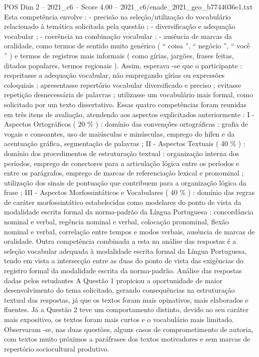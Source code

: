 \begin{textsample}{POS Dim 2 – 2021\_c6 – Score 4.00 – 2021\_c6/enade\_2021\_geo\_b7744036e1.txt}
Esta competência envolve : - precisão na seleção/utilização do vocabulário relacionado à temática solicitada pela questão ; - diversificação e adequação vocabular ; - coerência na combinação vocabular ; - ausência de marcas da oralidade, como termos de sentido muito genérico ( “ coisa ”, “ negócio ”, “ você ” ) e termos de registros mais informais ( como gírias, jargões, frases feitas, ditados populares, termos regionais ).
Assim, esperava -se que o participante : respeitasse a adequação vocabular, não empregando gírias ou expressões coloquiais ; apresentasse repertório vocabular diversificado e preciso ; evitasse repetição desnecessária de palavras ; utilizasse um vocabulário mais formal, como solicitado por um texto dissertativo.
Essas quatro competências foram reunidas em três itens de avaliação, atendendo aos aspectos explicitados anteriormente : I - Aspectos Ortográficos ( 20 \% ) : domínio das convenções ortográficas : grafia de vogais e consoantes, uso de maiúsculas e minúsculas, emprego do hífen e da acentuação gráfica, segmentação de palavras ; II - Aspectos Textuais ( 40 \% ) : domínio dos procedimentos de estruturação textual : organização interna dos períodos, emprego de conectores para a articulação lógica entre os períodos e entre os parágrafos, emprego de marcas de referenciação lexical e pronominal ; utilização dos sinais de pontuação que contribuem para a organização lógica da frase ; III - Aspectos Morfossintáticos e Vocabulares ( 40 \% ) : domínio das regras de caráter morfossintático estabelecidas como modelares do ponto de vista da modalidade escrita formal da norma-padrão da Língua Portuguesa : concordância nominal e verbal, regência nominal e verbal, colocação pronominal, flexão nominal e verbal, correlação entre tempos e modos verbais, ausência de marcas de oralidade.
Outra competência combinada a esta na análise das respostas é a seleção vocabular adequada à modalidade escrita formal da Língua Portuguesa, tendo em vista a intersecção entre as duas do ponto de vista das exigências do registro formal da modalidade escrita da norma-padrão.
Análise das respostas dadas pelos estudantes A Questão 1 propiciou a oportunidade de maior desenvolvimento do tema solicitado, gerando consequências na estruturação textual das respostas, já que os textos foram mais opinativos, mais elaborados e fluentes.
Já a Questão 2 teve um comportamento distinto, devido ao seu caráter mais expositivo, os textos foram mais curtos e o vocabulário mais limitado.
Observaram -se, nas duas questões, alguns casos de comprometimento de autoria, com textos muito próximos a paráfrases dos textos motivadores e sem marcas de repertório sociocultural produtivo.

\end{textsample}
